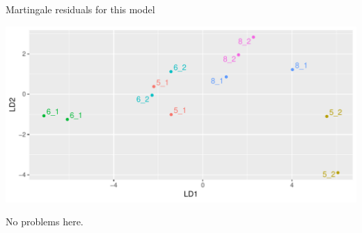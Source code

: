 \begin{frame}[fragile]{Martingale residuals for this model}
  
\begin{knitrout}
\color{fgcolor}\begin{kframe}
\begin{alltt}
\hlopt{+}\hlstd{(}
\end{alltt}


{\ttfamily\noindent\itshape\color{messagecolor}{\#\# `geom\_smooth()` using method = 'loess'}}\end{kframe}
\includegraphics[width=\maxwidth]{figure/unnamed-chunk-23-1} 

\end{knitrout}

No problems here.
  
\end{frame}


